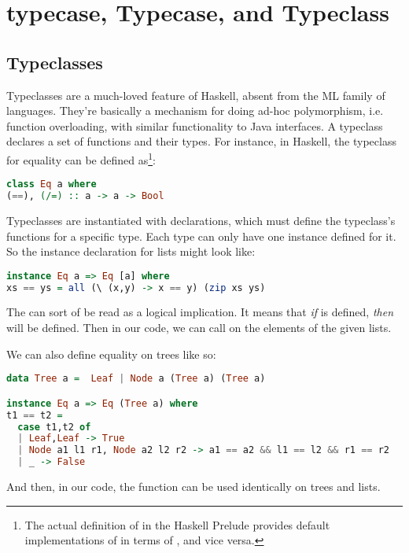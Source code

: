 \documentclass[pageno]{jpaper}
\begin{document}
{{{\section{typecase, Typecase, and Typeclass}

\subsection{Typeclasses}
Typeclasses are a much-loved feature of Haskell, absent from the ML family of languages. They're basically
a mechanism for doing ad-hoc polymorphism, i.e. function overloading, with similar functionality to
Java interfaces. A typeclass declares a set of functions and their types.
For instance, in Haskell, the  typeclass for equality can be defined as\footnote{The actual
definition of  in the Haskell Prelude provides default implementations of \lstiH{/=} in terms of \lstiH{==}, and vice versa.}:

\begin{lstlisting}[language=Haskell]
class Eq a where
(==), (/=) :: a -> a -> Bool
\end{lstlisting}

Typeclasses are instantiated with  declarations, which must define the typeclass's functions for a specific type.  Each type can only have one instance defined for it. So the
instance declaration for lists might look like:

\begin{lstlisting}[language=Haskell]
instance Eq a => Eq [a] where
xs == ys = all (\ (x,y) -> x == y) (zip xs ys)
\end{lstlisting}

The \lstiH{=>} can sort of be read as a logical implication. It means that \textit{if}  is defined, \textit{then}  will be defined.
Then in our code, we can call \lstiH{==} on the elements of the given lists.

We can also define equality on trees like so:

\begin{lstlisting}[language=Haskell]
data Tree a =  Leaf | Node a (Tree a) (Tree a)

instance Eq a => Eq (Tree a) where
t1 == t2 =
  case t1,t2 of
  | Leaf,Leaf -> True
  | Node a1 l1 r1, Node a2 l2 r2 -> a1 == a2 && l1 == l2 && r1 == r2
  | _ -> False
\end{lstlisting}

And then, in our code, the \lstiH{==} function can be used identically on trees and lists.

}}}
\end{document}

